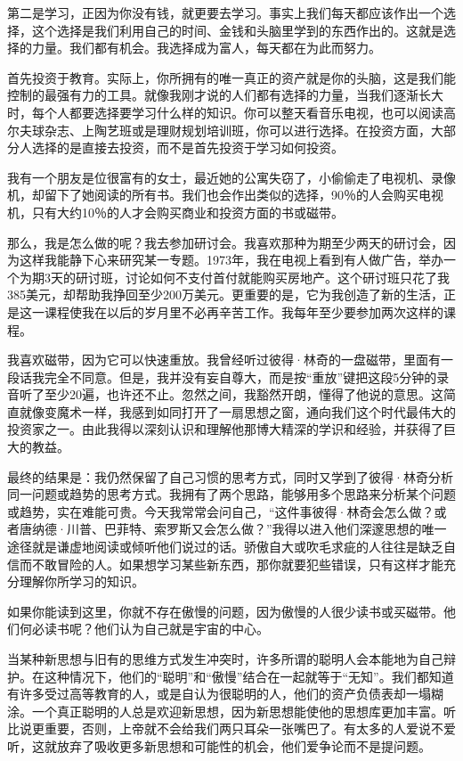 第二是学习，正因为你没有钱，就更要去学习。事实上我们每天都应该作出一个选择，这个选择是我们利用自己的时间、金钱和头脑里学到的东西作出的。这就是选择的力量。我们都有机会。我选择成为富人，每天都在为此而努力。

首先投资于教育。实际上，你所拥有的唯一真正的资产就是你的头脑，这是我们能控制的最强有力的工具。就像我刚才说的人们都有选择的力量，当我们逐渐长大时，每个人都要选择要学习什么样的知识。你可以整天看音乐电视，也可以阅读高尔夫球杂志、上陶艺班或是理财规划培训班，你可以进行选择。在投资方面，大部分人选择的是直接去投资，而不是首先投资于学习如何投资。

我有一个朋友是位很富有的女士，最近她的公寓失窃了，小偷偷走了电视机、录像机，却留下了她阅读的所有书。我们也会作出类似的选择，90％的人会购买电视机，只有大约10％的人才会购买商业和投资方面的书或磁带。

那么，我是怎么做的呢？我去参加研讨会。我喜欢那种为期至少两天的研讨会，因为这样我能静下心来研究某一专题。1973年，我在电视上看到有人做广告，举办一个为期3天的研讨班，讨论如何不支付首付就能购买房地产。这个研讨班只花了我385美元，却帮助我挣回至少200万美元。更重要的是，它为我创造了新的生活，正是这一课程使我在以后的岁月里不必再辛苦工作。我每年至少要参加两次这样的课程。

我喜欢磁带，因为它可以快速重放。我曾经听过彼得·林奇的一盘磁带，里面有一段话我完全不同意。但是，我并没有妄自尊大，而是按“重放”键把这段5分钟的录音听了至少20遍，也许还不止。忽然之间，我豁然开朗，懂得了他说的意思。这简直就像变魔术一样，我感到如同打开了一扇思想之窗，通向我们这个时代最伟大的投资家之一。由此我得以深刻认识和理解他那博大精深的学识和经验，并获得了巨大的教益。

最终的结果是：我仍然保留了自己习惯的思考方式，同时又学到了彼得·林奇分析同一问题或趋势的思考方式。我拥有了两个思路，能够用多个思路来分析某个问题或趋势，实在难能可贵。今天我常常会问自己，“这件事彼得·林奇会怎么做？或者唐纳德·川普、巴菲特、索罗斯又会怎么做？”我得以进入他们深邃思想的唯一途径就是谦虚地阅读或倾听他们说过的话。骄傲自大或吹毛求疵的人往往是缺乏自信而不敢冒险的人。如果想学习某些新东西，那你就要犯些错误，只有这样才能充分理解你所学习的知识。

如果你能读到这里，你就不存在傲慢的问题，因为傲慢的人很少读书或买磁带。他们何必读书呢？他们认为自己就是宇宙的中心。

当某种新思想与旧有的思维方式发生冲突时，许多所谓的聪明人会本能地为自己辩护。在这种情况下，他们的“聪明”和“傲慢”结合在一起就等于“无知”。我们都知道有许多受过高等教育的人，或是自认为很聪明的人，他们的资产负债表却一塌糊涂。一个真正聪明的人总是欢迎新思想，因为新思想能使他的思想库更加丰富。听比说更重要，否则，上帝就不会给我们两只耳朵一张嘴巴了。有太多的人爱说不爱听，这就放弃了吸收更多新思想和可能性的机会，他们爱争论而不是提问题。

